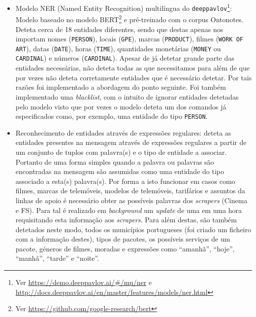 \documentclass[11pt,a4paper]{article}
\begin{document}
\begin{itemize}
    \item Modelo NER (Named Entity Recognition) multilíngua do \texttt{deeppavlov}\footnote{Ver
        \url{https://demo.deeppavlov.ai/\#/mu/ner} e
        \url{http://docs.deeppavlov.ai/en/master/features/models/ner.html}}: Modelo baseado no modelo
      BERT\footnote{Ver \url{https://github.com/google-research/bert}} e pré-treinado com o corpus Ontonotes.
      Deteta cerca de 18 entidades diferentes, sendo que destas apenas nos importam nomes (\texttt{PERSON}),
      locais (\texttt{GPE}), marcas (\texttt{PRODUCT}), filmes (\texttt{WORK OF ART}), datas (\texttt{DATE}),
      horas (\texttt{TIME}), quantidades monetárias (\texttt{MONEY} ou \texttt{CARDINAL}) e números
      (\texttt{CARDINAL}). Apesar de já detetar grande parte das entidades necessárias, não deteta todas as que
      necessitamos para além de que por vezes não deteta corretamente entidades que é necessário detetar.  Por
      tais razões foi implementado a abordagem do ponto seguinte.  Foi também implementado uma \textit{blacklist},
      com o intuito de ignorar entidades detetadas pelo modelo visto que por vezes o modelo deteta um dos
      comandos já especificados como, por exemplo, uma entidade do tipo \texttt{PERSON}.
    \item Reconhecimento de entidades através de expressões regulares: deteta as entidades presentes na
      mensagem através de expressões regulares a partir de um conjunto de tuplos com palavra(s) e o tipo de
      entidade a associar. Portanto de uma forma simples quando a palavra ou palavras são encontradas na mensagem
      são assumidas como uma entidade do tipo associado a esta(s) palavra(s).  Por forma a isto funcionar em casos como filmes,
      marcas de telemóveis, modelos de telemóveis, tarifários e assuntos da linhas de apoio é necessário obter as
      possíveis palavras dos \textit{scrapers} (Cinema e FS).  Para tal é realizado em \textit{background} um
      \textit{update} de uma em uma hora requisitando esta informação aos \textit{scrapers}.  Para além destas, são também
      detetados neste modo, todos os municípios portugueses (foi criado um ficheiro com a informação destes),
      tipos de pacotes, os possíveis serviços de um pacote, géneros de filmes, moradas e expressões como
      ``amanhã'', ``hoje'', ``manhã'', ``tarde'' e ``noite''.
\end{itemize}
\end{document}
